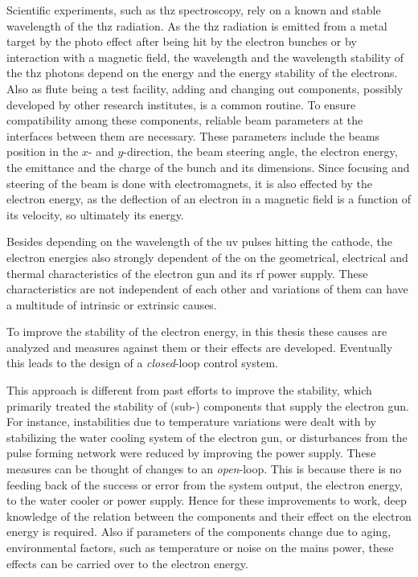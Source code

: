 Scientific experiments, such as \gls{thz} spectroscopy, rely on a known and stable wavelength of the \gls{thz} radiation. As the \gls{thz} radiation is emitted from a metal target by the photo effect after being hit by the electron bunches or by interaction with a magnetic field, the wavelength and the wavelength stability of the \gls{thz} photons depend on the energy and the energy stability of the electrons.
Also as \gls{flute} being a test facility, adding and changing out components, possibly developed by other research institutes, is a common routine. To ensure compatibility among these components, reliable beam parameters at the interfaces between them are necessary. These parameters include the beams position in the $x$- and $y$-direction, the beam steering angle, the electron energy, the emittance and the charge of the bunch and its dimensions. Since focusing and steering of the beam is done with electromagnets, it is also effected by the electron energy, as the deflection of an electron in a magnetic field is a function of its velocity, so ultimately its energy.

Besides depending on the wavelength of the \gls{uv} pulses hitting the cathode, the electron energies also strongly dependent of the  on the geometrical, electrical and thermal characteristics of the electron gun and its \gls{rf} power supply. These characteristics are not independent of each other and variations of them can have a multitude of intrinsic or extrinsic causes.

To improve the stability of the electron energy, in this thesis these causes are analyzed and measures against them or their effects are developed. Eventually this leads to the design of a \textit{closed}-loop control system. 

This approach is different from past efforts to improve the stability, which primarily treated the stability of (sub-) components that supply the electron gun. For instance, instabilities due to temperature variations were dealt with by stabilizing the water cooling system of the electron gun, or disturbances from the pulse forming network were reduced by improving the power supply. These measures can be thought of changes to an \textit{open}-loop. This is because there is no feeding back of the success or error from the system output, the electron energy, to the water cooler or power supply. Hence for these improvements to work, deep knowledge of the relation between the components and their effect on the electron energy is required. Also if parameters of the components change due to aging, environmental factors, such as temperature or noise on the mains power, these effects can be carried over to the electron energy.

